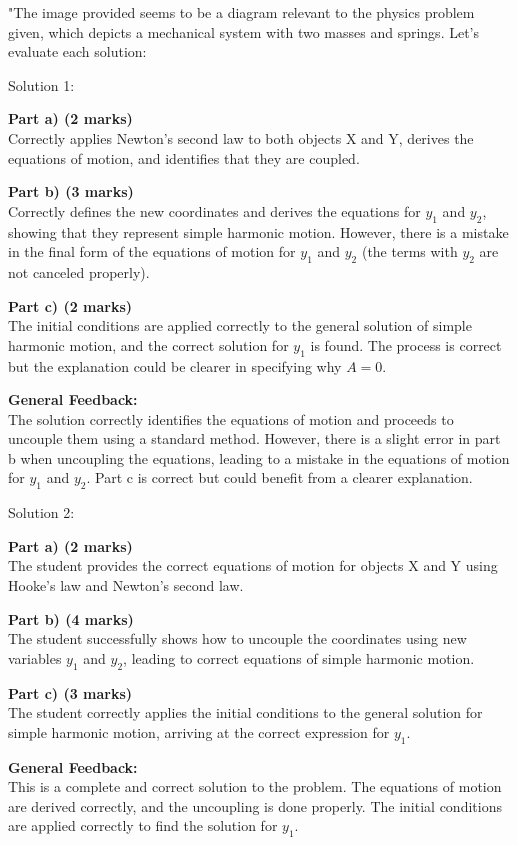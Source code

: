 \documentclass[a4paper,11pt]{article}
\begin{document}
"The image provided seems to be a diagram relevant to the physics problem given, which depicts a mechanical system with two masses and springs. Let's evaluate each solution:

Solution 1:

\textbf{Part a) (2 marks)}\\
Correctly applies Newton's second law to both objects X and Y, derives the equations of motion, and identifies that they are coupled. 

\textbf{Part b) (3 marks)}\\
Correctly defines the new coordinates and derives the equations for \( y_1 \) and \( y_2 \), showing that they represent simple harmonic motion. However, there is a mistake in the final form of the equations of motion for \( y_1 \) and \( y_2 \) (the terms with \( y_2 \) are not canceled properly).

\textbf{Part c) (2 marks)}\\
The initial conditions are applied correctly to the general solution of simple harmonic motion, and the correct solution for \( y_1 \) is found. The process is correct but the explanation could be clearer in specifying why \( A = 0 \).

\textbf{General Feedback:}\\
The solution correctly identifies the equations of motion and proceeds to uncouple them using a standard method. However, there is a slight error in part b when uncoupling the equations, leading to a mistake in the equations of motion for \( y_1 \) and \( y_2 \). Part c is correct but could benefit from a clearer explanation.

Solution 2:

\textbf{Part a) (2 marks)}\\
The student provides the correct equations of motion for objects X and Y using Hooke's law and Newton's second law.

\textbf{Part b) (4 marks)}\\
The student successfully shows how to uncouple the coordinates using new variables \( y_1 \) and \( y_2 \), leading to correct equations of simple harmonic motion.

\textbf{Part c) (3 marks)}\\
The student correctly applies the initial conditions to the general solution for simple harmonic motion, arriving at the correct expression for \( y_1 \).

\textbf{General Feedback:}\\
This is a complete and correct solution to the problem. The equations of motion are derived correctly, and the uncoupling is done properly. The initial conditions are applied correctly to find the solution for \( y_1 \).
\end{document}
